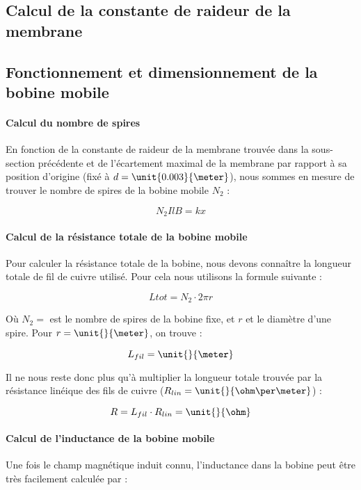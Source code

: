 \subsection{Calcul de la constante de raideur de la membrane}

\subsection{Fonctionnement et dimensionnement de la bobine mobile}

\paragraph{Calcul du nombre de spires}
En fonction de la constante de raideur de la membrane trouvée dans la sous-section précédente et de l'écartement
maximal de la membrane par rapport à sa position d'origine (fixé à $d = \unit{0.003}{\meter}$), nous sommes en
mesure de trouver le nombre de spires de la bobine mobile $N_2$ :

$$N_2IlB = kx$$


\paragraph{Calcul de la résistance totale de la bobine mobile}
Pour calculer la résistance totale de la bobine, nous devons connaître la longueur totale de fil de cuivre utilisé.
Pour cela nous utilisons la formule suivante :

$$L{tot} = N_2 \cdot 2\pi r$$

Où $N_2 = $ est le nombre de spires de la bobine fixe, et $r$ et le diamètre d'une spire. Pour
$r = \unit{}{\meter}$, on trouve :

$$L_{fil} = \unit{}{\meter}$$

Il ne nous reste donc plus qu'à multiplier la longueur totale trouvée par la résistance linéique des fils de cuivre
($R_{lin} = \unit{}{\ohm\per\meter}$) :

$$R = L_{fil} \cdot R_{lin} = \unit{}{\ohm}$$

\paragraph{Calcul de l'inductance de la bobine mobile}

Une fois le champ magnétique induit connu, l'inductance dans la bobine peut être très facilement calculée par :

